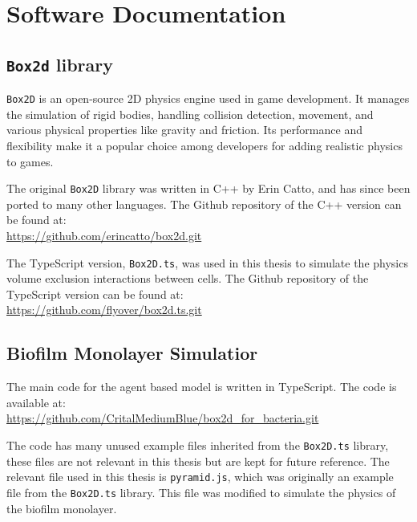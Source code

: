 \chapter{Software Documentation}




\section{\texttt{Box2d} library}

\texttt{Box2D} is an open-source 2D physics engine used in game development. It manages the simulation of rigid bodies, handling collision detection, movement, and various physical properties like gravity and friction. Its performance and flexibility make it a popular choice among developers for adding realistic physics to games.

The original \texttt{Box2D} library was written in C++ by Erin Catto, and has since been ported to many other languages. The Github repository of the C++ version can be found at: \\ 
\url{https://github.com/erincatto/box2d.git}

The TypeScript version, \texttt{Box2D.ts}, was used in this thesis to simulate the physics volume exclusion interactions between cells.  The Github repository of the TypeScript version can be found at: \\ 
\url{https://github.com/flyover/box2d.ts.git}


\section{Biofilm Monolayer Simulatior}

The main code for the agent based model is written in TypeScript. The code is available at: \\
\url{https://github.com/CritalMediumBlue/box2d_for_bacteria.git}

The code has many unused example files inherited from the \texttt{Box2D.ts} library, these files are not relevant in this thesis but are kept for future reference. 
The relevant file used in this thesis is \texttt{pyramid.js}, which was originally an example file from the \texttt{Box2D.ts} library. This file was modified to simulate the physics of the biofilm monolayer. 


